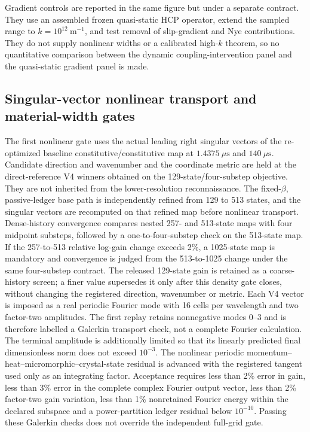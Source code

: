 Gradient controls are reported in the same figure but under a separate contract. They use an assembled frozen quasi-static HCP operator, extend the sampled range to $k=10^{12}~\mathrm{m^{-1}}$, and test removal of slip-gradient and Nye contributions. They do not supply nonlinear widths or a calibrated high-$k$ theorem, so no quantitative comparison between the dynamic coupling-intervention panel and the quasi-static gradient panel is made.

\subsection{Singular-vector nonlinear transport and material-width gates}

The first nonlinear gate uses the actual leading right singular vectors of the
re-optimized baseline constitutive/constitutive map at $1.4375~\mu\mathrm s$
and $140~\mu\mathrm s$.  Candidate direction and wavenumber and the coordinate
metric are held at the direct-reference V4 winners obtained on the
129-state/four-substep objective.  They are not inherited from the lower-resolution
reconnaissance.  The fixed-$\beta$, passive-ledger base path
is independently refined from 129 to 513 states, and the singular vectors are
recomputed on that refined map before nonlinear transport.  Dense-history
convergence compares nested 257- and 513-state maps with four midpoint
substeps, followed by a one-to-four-substep check on the 513-state map.  If
the 257-to-513 relative log-gain change exceeds 2\%, a 1025-state map is
mandatory and convergence is judged from the 513-to-1025 change under the
same four-substep contract.  The released 129-state gain is retained as a
coarse-history screen; a finer value supersedes it only after this density
gate closes, without changing the registered direction, wavenumber or metric.
Each V4 vector is imposed as a
real periodic Fourier mode
with 16 cells per wavelength and two factor-two amplitudes.  The first replay
retains nonnegative modes 0--3 and is therefore labelled a Galerkin transport
check, not a complete Fourier calculation.  The terminal
amplitude is additionally limited so that its linearly predicted final
dimensionless norm does not exceed $10^{-3}$. The nonlinear periodic
momentum--heat--micromorphic--crystal-state residual is advanced with the
registered tangent used only as an integrating factor. Acceptance requires
less than 2\% error in gain, less than 3\% error in the complete complex
Fourier output vector, less than 2\% factor-two gain variation, less than 1\%
nonretained Fourier energy within the declared subspace and a power-partition
ledger residual below $10^{-10}$.  Passing these Galerkin checks does not
override the independent full-grid gate.


